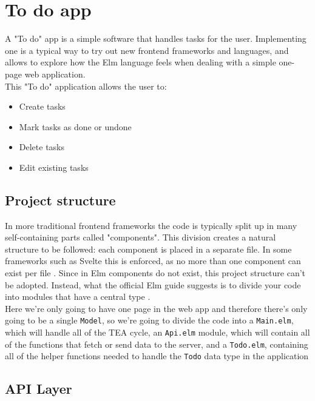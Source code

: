 \section{To do app}

A "To do" app is a simple software that handles tasks for the user. Implementing one is a typical way to try out new frontend frameworks and languages, and allows to explore how the Elm language feels when dealing with a simple one-page web application. \\
This "To do" application allows the user to:
\begin{itemize}
    \item Create tasks
    \item Mark tasks as done or undone
    \item Delete tasks
    \item Edit existing tasks
\end{itemize}

\subsection{Project structure}

In more traditional frontend frameworks the code is typically split up in many self-containing parts called "components". This division creates a natural structure to be followed: each component is placed in a separate file. In some frameworks such as Svelte this is enforced, as no more than one component can exist per file \cite{noauthor_svelte_nodate}. Since in Elm components do not exist, this project structure can't be adopted. Instead, what the official Elm guide suggests is to divide your code into modules that have a central type \cite{noauthor_structure_nodate} .\\

Here we're only going to have one page in the web app and therefore there's only going to be a single \texttt{Model}, so we're going to divide the code into a \texttt{Main.elm}, which will handle all of the TEA cycle, an \texttt{Api.elm} module, which will contain all of the functions that fetch or send data to the server, and a \texttt{Todo.elm}, containing all of the helper functions needed to handle the \texttt{Todo} data type in the application

\subsection{API Layer}


